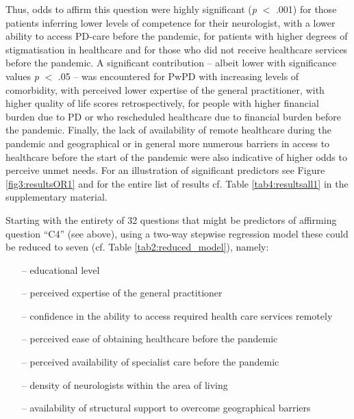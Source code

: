\documentclass[a4paper,oneside,11pt,english]{scrartcl}
\begin{document}
Thus, odds to affirm this question were highly significant (\textit{p} $<$ .001) for those patients inferring lower levels of competence for their neurologist, with a lower ability to access \textsc{PD}-care before the pandemic, for patients with higher degrees of stigmatisation in healthcare and for those who did not receive healthcare services before the pandemic. A significant contribution -- albeit lower with significance values \textit{p} $<$ .05 --  was encountered for Pw\textsc{PD} with increasing levels of comorbidity, with perceived lower expertise of the general practitioner, with higher quality of life scores retrospectively, for people with higher financial burden due to \textsc{PD} or who rescheduled healthcare due to financial burden before the pandemic. Finally, the lack of availability of remote healthcare during the pandemic and geographical or in general more numerous barriers in access to healthcare before the start of the pandemic were also indicative of higher odds to perceive unmet needs. For an illustration of significant predictors see Figure \ref{fig3:resultsOR1} and for the entire list of results cf. Table \ref{tab4:resultsall1} in the supplementary material. 

Starting with the entirety of 32 questions that might be predictors of affirming question ``C4'' (see above), using a two-way stepwise regression model these could be reduced to seven (cf. Table \ref{tab2:reduced_model}), namely: 
\begin{itemize}
	\item[--] educational level
	\item[--] perceived expertise of the general practitioner
	\item[--] confidence in the ability to access required health care services remotely
	\item[--] perceived ease of obtaining healthcare before the pandemic
	\item[--] perceived availability of specialist care before the pandemic
	\item[--] density of neurologists within the area of living
	\item[--] availability of structural support to overcome geographical barriers
\end{itemize}
\end{document}
